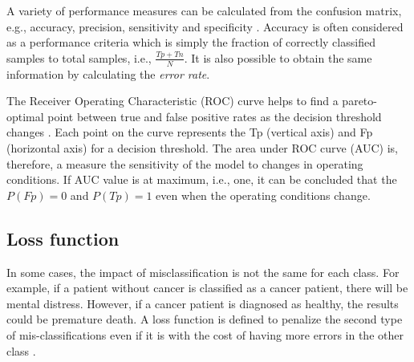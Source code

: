 A variety of performance measures can be calculated from the confusion matrix, e.g., accuracy, precision, sensitivity and specificity \cite{Bradley1997}. Accuracy is often considered as a performance criteria which is simply the fraction of correctly classified samples to total samples, i.e., {\large $\frac{Tp + Tn}{N}$}. It is also possible to obtain the same information by calculating the \textit{error rate}.

The Receiver Operating Characteristic (ROC) curve helps to find a pareto-optimal point between true and false positive rates as the decision threshold changes \cite{Bradley1997}. Each point on the curve represents the Tp (vertical axis) and Fp (horizontal axis) for a decision threshold. The area under ROC curve (AUC) is, therefore, a measure the sensitivity of the model to changes in operating conditions. If AUC value is at maximum, i.e., one, it can be concluded that the $P(Fp) = 0$ and $P(Tp) = 1$ even when the operating conditions change. 
\subsection{Loss function}
In some cases, the impact of misclassification is not the same for each class. For example, if a patient without cancer is classified as a cancer patient, there will be mental distress. However, if a cancer patient is diagnosed as healthy, the results could be premature death. A loss function is defined to penalize the second type of mis-classifications even if it is with the cost of having more errors in the other class \cite{bishop2006pattern}.
